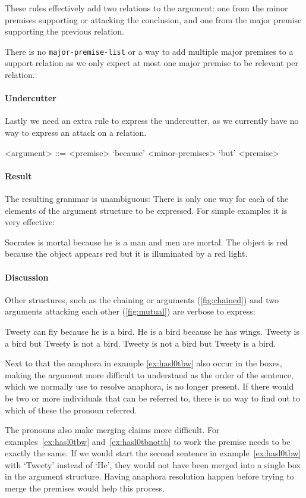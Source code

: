 \noindent These rules effectively add two relations to the argument: one from the minor premises supporting or attacking the conclusion, and one from the major premise supporting the previous relation.

There is no \texttt{major-premise-list} or a way to add multiple major premises to a support relation as we only expect at most one major premise to be relevant per relation.

\paragraph{Undercutter} Lastly we need an extra rule to express the undercutter, as we currently have no way to express an attack on a relation.

\begin{grammar}
<argument> ::= <premise> `because' <minor-premises> `but' <premise> %
\end{grammar}

\paragraph{Result} The resulting grammar is unambiguous: There is only one way for each of the elements of the argument structure to be expressed. For simple examples it is very effective:

\begin{exe}
    \ex Socrates is mortal because he is a man and men are mortal.
    \ex The object is red because the object appears red but it is illuminated by a red light.
\end{exe}

\paragraph{Discussion}
Other structures, such as the chaining or arguments (\autoref{fig:chained}) and two arguments attacking each other (\autoref{fig:mutual}) are verbose to express:

\begin{exe}
    \ex\label{ex:hasl0tbw} Tweety can fly because he is a bird. He is a bird because he has wings.
    \ex\label{ex:hasl0tbnottb} Tweety is a bird but Tweety is not a bird. Tweety is not a bird but Tweety is a bird.
\end{exe}

\noindent Next to that the anaphora in example \ref{ex:hasl0tbw} also occur in the boxes, making the argument more difficult to understand as the order of the sentence, which we normally use to resolve anaphora, is no longer present. If there would be two or more individuals that can be referred to, there is no way to find out to which of these the pronoun referred.

The pronouns also make merging claims more difficult. For examples~\ref{ex:hasl0tbw} and~\ref{ex:hasl0tbnottb} to work the premise needs to be exactly the same. If we would start the second sentence in example~\ref{ex:hasl0tbw} with `Tweety' instead of `He', they would not have been merged into a single box in the argument structure. Having anaphora resolution happen before trying to merge the premises would help this process.
